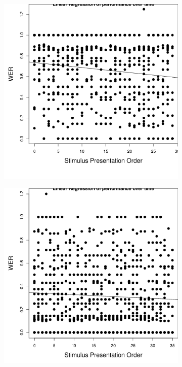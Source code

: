 \DIFaddbegin \begin{figure}[ht]%
\centering
\begin{subfigure}{0.47\textwidth}
\centering

\includegraphics[width=\maxwidth]{figure/line_graph_chrono_m-1} 

\caption{\textbf{} }
\label{fig:linear_performance_m}
\end{subfigure}
\hfill
\begin{subfigure}{0.47\textwidth}%
\centering

\includegraphics[width=\maxwidth]{figure/line_graph_chrono-1} 


\end{subfigure}
\end{figure}
